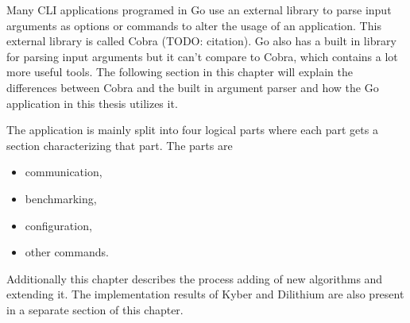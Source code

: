 Many CLI applications programed in Go use an external library to parse input arguments as options or commands to alter the usage of an application. This external library is called Cobra (TODO: citation). Go also has a built in library for parsing input arguments but it can't compare to Cobra, which contains a lot more useful tools. The following section in this chapter will explain the differences between Cobra and the built in argument parser and how the Go application in this thesis utilizes it. 

The application is mainly split into four logical parts where each part gets a section characterizing that part. The parts are
\begin{itemize}
  \item communication,
  \item benchmarking,
  \item configuration,
  \item other commands.
\end{itemize}
\noindent Additionally this chapter describes the process adding of new algorithms and extending it. The implementation results of Kyber and Dilithium are also present in a separate section of this chapter. 


